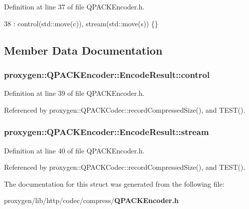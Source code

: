 Definition at line 37 of file Q\+P\+A\+C\+K\+Encoder.\+h.


\begin{DoxyCode}
38         : control(std::move(c)), stream(std::move(s)) \{\}
\end{DoxyCode}


\subsection{Member Data Documentation}
\subsubsection[{control}]{ proxygen\+::\+Q\+P\+A\+C\+K\+Encoder\+::\+Encode\+Result\+::control}\label{structproxygen_1_1QPACKEncoder_1_1EncodeResult_af1e95086af24375422f74539d1a9acce}


Definition at line 39 of file Q\+P\+A\+C\+K\+Encoder.\+h.



Referenced by proxygen\+::\+Q\+P\+A\+C\+K\+Codec\+::record\+Compressed\+Size(), and T\+E\+S\+T().

\subsubsection[{stream}]{ proxygen\+::\+Q\+P\+A\+C\+K\+Encoder\+::\+Encode\+Result\+::stream}\label{structproxygen_1_1QPACKEncoder_1_1EncodeResult_a671339fd627bebfa15c4118ce7cbb878}


Definition at line 40 of file Q\+P\+A\+C\+K\+Encoder.\+h.



Referenced by proxygen\+::\+Q\+P\+A\+C\+K\+Codec\+::record\+Compressed\+Size(), and T\+E\+S\+T().



The documentation for this struct was generated from the following file\+:\begin{DoxyCompactItemize}
\item 
proxygen/lib/http/codec/compress/{\bf Q\+P\+A\+C\+K\+Encoder.\+h}\end{DoxyCompactItemize}

